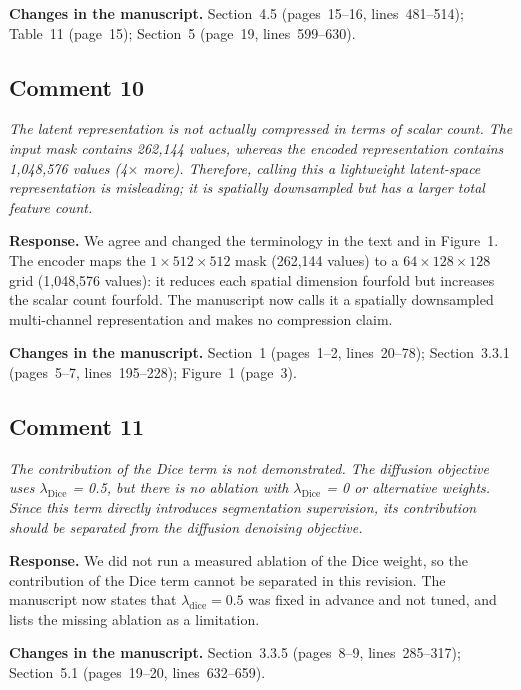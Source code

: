 \documentclass[11pt,a4paper]{article}
\newenvironment{revcomment}{\par\medskip\noindent\begin{minipage}{\linewidth}\itshape}{\end{minipage}\par\smallskip}
\begin{document}
\textbf{Changes in the manuscript.} Section~4.5 (pages~15--16, lines~481--514); Table~11 (page~15); Section~5 (page~19, lines~599--630).

\subsection*{Comment 10}
\begin{revcomment}The latent representation is not actually compressed in terms of scalar count. The input mask contains 262,144 values, whereas the encoded representation contains 1,048,576 values (4$\times$ more). Therefore, calling this a lightweight latent-space representation is misleading; it is spatially downsampled but has a larger total feature count.\end{revcomment}
\textbf{Response.} We agree and changed the terminology in the text and in Figure~1. The encoder maps the $1\times512\times512$ mask (262,144 values) to a $64\times128\times128$ grid (1,048,576 values): it reduces each spatial dimension fourfold but increases the scalar count fourfold. The manuscript now calls it a spatially downsampled multi-channel representation and makes no compression claim.

\textbf{Changes in the manuscript.} Section~1 (pages~1--2, lines~20--78); Section~3.3.1 (pages~5--7, lines~195--228); Figure~1 (page~3).

\subsection*{Comment 11}
\begin{revcomment}The contribution of the Dice term is not demonstrated. The diffusion objective uses $\lambda_{\mathrm{Dice}}$ = 0.5, but there is no ablation with $\lambda_{\mathrm{Dice}}$ = 0 or alternative weights. Since this term directly introduces segmentation supervision, its contribution should be separated from the diffusion denoising objective.\end{revcomment}
\textbf{Response.} We did not run a measured ablation of the Dice weight, so the contribution of the Dice term cannot be separated in this revision. The manuscript now states that $\lambda_{\mathrm{dice}}=0.5$ was fixed in advance and not tuned, and lists the missing ablation as a limitation.

\textbf{Changes in the manuscript.} Section~3.3.5 (pages~8--9, lines~285--317); Section~5.1 (pages~19--20, lines~632--659).
\end{document}
